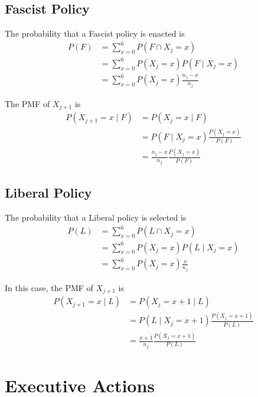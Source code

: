 \documentclass[fleqn, 12pt, letterpaper]{article}
\begin{document}
\subsection{Fascist Policy}
The probability that a Fascist policy is enacted is
\begin{align*}
	P(F)
		&= \sum_{x=0}^6 P(F \cap X_j=x) \\
		&= \sum_{x=0}^6 P(X_j=x) P(F \mid X_j=x) \\
		&= \sum_{x=0}^6 P(X_j=x) \frac{n_j-x}{n_j}
\end{align*}

The PMF of $X_{j+1}$ is
\begin{align*}
	P(X_{j+1}=x \mid F)
		&= P(X_j=x \mid F) \\
		&= P(F \mid X_j=x) \frac{P(X_j=x)}{P(F)} \\
		&= \frac{n_j-x}{n_j} \frac{P(X_j=x)}{P(F)}
\end{align*}

\subsection{Liberal Policy}
The probability that a Liberal policy is selected is
\begin{align*}
	P(L)
		&= \sum_{x=0}^6 P(L \cap X_j=x) \\
		&= \sum_{x=0}^6 P(X_j=x) P(L \mid X_j=x) \\
		&= \sum_{x=0}^6 P(X_j=x) \frac{x}{n_j}
\end{align*}

In this case, the PMF of $X_{j+1}$ is
\begin{align*}
	P(X_{j+1}=x \mid L)
		&= P(X_j=x+1 \mid L) \\
		&= P(L \mid X_j=x+1) \frac{P(X_j=x+1)}{P(L)} \\
		&= \frac{x+1}{n_j} \frac{P(X_j=x+1)}{P(L)}
\end{align*}

\newpage
\section{Executive Actions}
\end{document}
